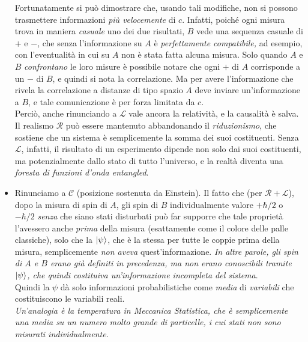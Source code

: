\documentclass[../../FisicaTeorica.tex]{subfiles}
\begin{document}
\begin{itemize}
Fortunatamente si può dimostrare che, usando tali modifiche, non si possono trasmettere informazioni \textit{più velocemente} di $c$. Infatti, poiché ogni misura trova in maniera \textit{casuale} uno dei due risultati, $B$ vede una sequenza casuale di $+$ e $-$, che senza l'informazione su $A$ è \textit{perfettamente compatibile,} ad esempio, con l'eventualità in cui su $A$ non è stata fatta alcuna misura. Solo quando $A$ e $B$ \textit{confrontano} le loro misure è possibile notare che ogni $+$ di $A$ corrisponde a un $-$ di $B$, e quindi si nota la correlazione. Ma per avere l'informazione che rivela la correlazione a distanze di tipo spazio $A$ deve inviare un'informazione a $B$, e tale comunicazione è per forza limitata da $c$.\\
Perciò, anche rinunciando a $\mathcal{L}$ vale ancora la relatività, e la causalità è salva.\\
Il realismo $\mathcal{R}$ può essere mantenuto abbandonando il \textit{riduzionismo}, che sostiene che un sistema è semplicemente la somma dei suoi costituenti. Senza $\mathcal{L}$, infatti, il risultato di un esperimento dipende non solo dai suoi costituenti, ma potenzialmente dallo stato di tutto l'universo, e la realtà diventa una \textit{foresta di funzioni d'onda entangled}.
\item Rinunciamo a $\mathcal{C}$ (posizione sostenuta da Einstein). Il fatto che (per $\mathcal{R} + \mathcal{L}$), dopo la misura di spin di $A$, gli spin di $B$  individualmente valore $+\hbar/2$ o $-\hbar/2$ \textit{senza} che siano stati disturbati può far supporre che tale proprietà l'avessero anche \textit{prima} della misura (esattamente come il colore delle palle classiche), solo che la $\Ket{\psi}$, che è la stessa per tutte le coppie prima della misura, semplicemente \textit{non aveva} quest'informazione. \textit{In altre parole, gli spin di $A$ e $B$ erano già definiti in precedenza, ma non erano conoscibili tramite $\Ket{\psi}$, che quindi costituiva un'informazione incompleta del sistema}.\\
Quindi la $\psi$ dà solo informazioni probabilistiche come \textit{media} di \textit{variabili } che costituiscono le  variabili reali.\\
\textit{Un'analogia è la temperatura in Meccanica Statistica, che è semplicemente una media su un numero molto grande di particelle, i cui stati non sono misurati individualmente}.\\
\end{itemize}
\end{document}
